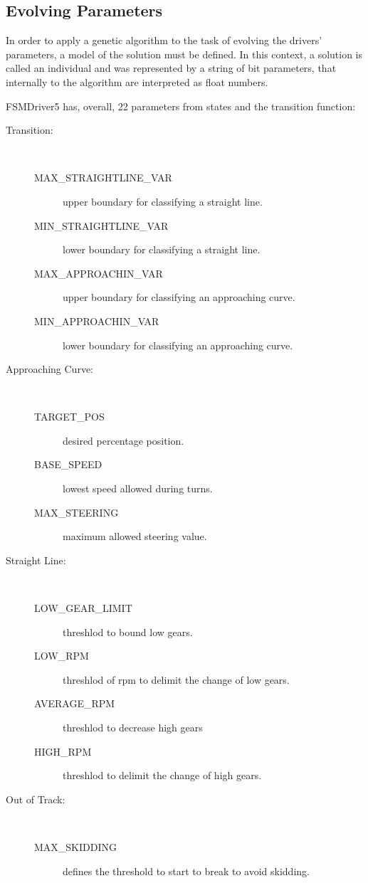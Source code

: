 \subsection{Evolving Parameters}%
In order to apply a genetic algorithm to the task of evolving the drivers' parameters, a model of the solution must be defined. In this context, a solution is called an individual and was represented by a string of bit parameters, that internally to the algorithm are interpreted as float numbers.

FSMDriver5 has, overall, 22 parameters from states and the transition function:

\begin{description}
	\item[Transition:] \ %
	\begin{description}
		\item[MAX\_STRAIGHTLINE\_VAR] upper boundary for classifying a straight line.
		\item[MIN\_STRAIGHTLINE\_VAR] lower boundary for classifying a straight line.
		\item[MAX\_APPROACHIN\_VAR] upper boundary for classifying an approaching curve.
		\item[MIN\_APPROACHIN\_VAR] lower boundary for classifying an approaching curve.
	\end{description}
	\item[Approaching Curve:] \ %
	\begin{description}
		\item[TARGET\_POS] desired percentage position.
		\item[BASE\_SPEED] lowest speed allowed during turns.
		\item[MAX\_STEERING] maximum allowed steering value.
	\end{description}
	\item[Straight Line:] \ %
	\begin{description}
		\item[LOW\_GEAR\_LIMIT] threshlod to bound low gears.
		\item[LOW\_RPM] threshlod of rpm to delimit the change of low gears.
		\item[AVERAGE\_RPM] threshlod to decrease high gears
		\item[HIGH\_RPM] threshlod to delimit the change of high gears.
	\end{description}
	\item[Out of Track:] \ %
	\begin{description}
		\item[MAX\_SKIDDING] defines the threshold to start to break to avoid skidding.

\end{description}
\end{description}
